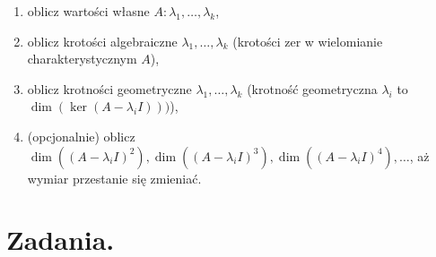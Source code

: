 \begin{enumerate}
	\item oblicz wartości własne $A: \lambda_1, \dots, \lambda_k$,
	\item oblicz krotości algebraiczne $\lambda_1, \dots, \lambda_k$
		(krotości zer w wielomianie charakterystycznym $A$),
	\item oblicz krotności geometryczne $\lambda_1, \dots, \lambda_k$
		(krotność geometryczna $\lambda_i$ to $\dim(\ker(A - \lambda_i I)))$),
	\item (opcjonalnie) oblicz $\dim((A - \lambda_i I)^2), \dim((A - \lambda_i I)^3), \dim((A - \lambda_i I)^4), \dots$, aż wymiar przestanie się zmieniać.
\end{enumerate}

\section{Zadania.}
